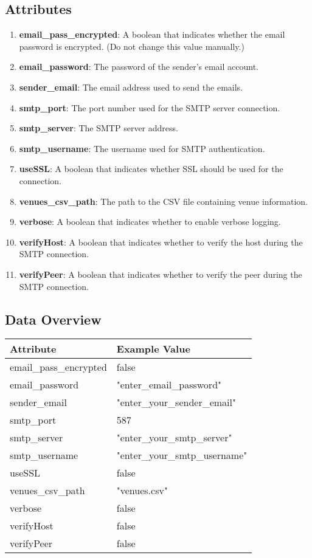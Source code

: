 \documentclass{article}
\begin{document}
	\subsection*{Attributes}
	\begin{enumerate}
		\item \textbf{email\_pass\_encrypted}: A boolean that indicates whether the email password is encrypted. (Do not change this value manually.)
		\item \textbf{email\_password}: The password of the sender's email account.
		\item \textbf{sender\_email}: The email address used to send the emails.
		\item \textbf{smtp\_port}: The port number used for the SMTP server connection.
		\item \textbf{smtp\_server}: The SMTP server address.
		\item \textbf{smtp\_username}: The username used for SMTP authentication.
		\item \textbf{useSSL}: A boolean that indicates whether SSL should be used for the connection.
		\item \textbf{venues\_csv\_path}: The path to the CSV file containing venue information.
		\item \textbf{verbose}: A boolean that indicates whether to enable verbose logging.
		\item \textbf{verifyHost}: A boolean that indicates whether to verify the host during the SMTP connection.
		\item \textbf{verifyPeer}: A boolean that indicates whether to verify the peer during the SMTP connection.
	\end{enumerate}
	
	\subsection*{Data Overview}
	
	\begin{tabular}{|l|l|}
		\hline
		\textbf{Attribute} & \textbf{Example Value} \\
		\hline
		email\_pass\_encrypted & false \\
		\hline
		email\_password & "enter\_email\_password" \\
		\hline
		sender\_email & "enter\_your\_sender\_email" \\
		\hline
		smtp\_port & 587 \\
		\hline
		smtp\_server & "enter\_your\_smtp\_server" \\
		\hline
		smtp\_username & "enter\_your\_smtp\_username" \\
		\hline
		useSSL & false \\
		\hline
		venues\_csv\_path & "venues.csv" \\
		\hline
		verbose & false \\
		\hline
		verifyHost & false \\
		\hline
		verifyPeer & false \\
		\hline
	\end{tabular}
	
\end{document}
